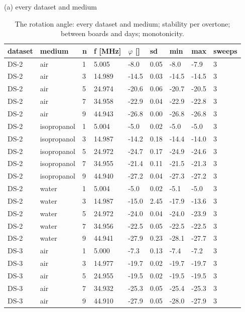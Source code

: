 \documentclass[11pt,a4paper]{article}
\begin{document}
(a) every dataset and medium

\begin{landscape}{\scriptsize\setlength{\tabcolsep}{2pt}
\begin{longtable}{@{}lllllllll@{}}
\caption{The rotation angle: every dataset and medium; stability per overtone; between boards and days; monotonicity.}\\
\toprule
dataset & medium & n & f [MHz] & $\varphi$ [\textdegree{}] & sd & min & max & sweeps \\\midrule\endhead
DS-2 & air & 1 & 5.005 & -8.0 & 0.05 & -8.0 & -7.9 & 3 \\
DS-2 & air & 3 & 14.989 & -14.5 & 0.03 & -14.5 & -14.5 & 3 \\
DS-2 & air & 5 & 24.974 & -20.6 & 0.06 & -20.7 & -20.5 & 3 \\
DS-2 & air & 7 & 34.958 & -22.9 & 0.04 & -22.9 & -22.8 & 3 \\
DS-2 & air & 9 & 44.943 & -26.8 & 0.00 & -26.8 & -26.8 & 3 \\
DS-2 & isopropanol & 1 & 5.004 & -5.0 & 0.02 & -5.0 & -5.0 & 3 \\
DS-2 & isopropanol & 3 & 14.987 & -14.2 & 0.18 & -14.4 & -14.0 & 3 \\
DS-2 & isopropanol & 5 & 24.972 & -24.7 & 0.17 & -24.9 & -24.6 & 3 \\
DS-2 & isopropanol & 7 & 34.955 & -21.4 & 0.11 & -21.5 & -21.3 & 3 \\
DS-2 & isopropanol & 9 & 44.940 & -27.2 & 0.04 & -27.3 & -27.2 & 3 \\
DS-2 & water & 1 & 5.004 & -5.0 & 0.02 & -5.1 & -5.0 & 3 \\
DS-2 & water & 3 & 14.987 & -15.0 & 2.45 & -17.9 & -13.6 & 3 \\
DS-2 & water & 5 & 24.972 & -24.0 & 0.04 & -24.0 & -23.9 & 3 \\
DS-2 & water & 7 & 34.956 & -22.5 & 0.05 & -22.5 & -22.5 & 3 \\
DS-2 & water & 9 & 44.941 & -27.9 & 0.23 & -28.1 & -27.7 & 3 \\
DS-3 & air & 1 & 5.000 & -7.3 & 0.13 & -7.4 & -7.2 & 3 \\
DS-3 & air & 3 & 14.977 & -19.7 & 0.02 & -19.7 & -19.7 & 3 \\
DS-3 & air & 5 & 24.955 & -19.5 & 0.02 & -19.5 & -19.5 & 3 \\
DS-3 & air & 7 & 34.932 & -25.3 & 0.05 & -25.4 & -25.3 & 3 \\
DS-3 & air & 9 & 44.910 & -27.9 & 0.05 & -28.0 & -27.9 & 3 \\

\end{longtable}}
\end{landscape}
\end{document}
